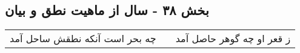 \begin{center}
\section*{بخش ۳۸ - سال از ماهیت نطق و بیان}
\label{sec:sh038}
\begin{longtable}{l p{0.5cm} r}
چه بحر است آنکه نطقش ساحل آمد
&&
ز قعر او چه گوهر حاصل آمد
\\
\end{longtable}
\end{center}
